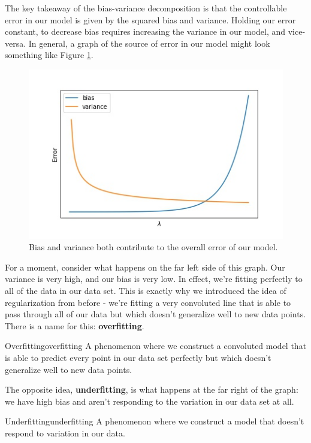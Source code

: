 \newpage
The key takeaway of the bias-variance decomposition is that the controllable error in our model is given by the squared bias and variance. Holding our error constant, to decrease bias requires increasing the variance in our model, and vice-versa. In general, a graph of the source of error in our model might look something like Figure \ref{fig:bias-vs-variance}.

\begin{figure}
    \centering
    \includegraphics[width=0.5\paperwidth]{../LinearRegression/fig/biasvariance_GEN.jpg}
    \caption{Bias and variance both contribute to the overall error of our model.}
    \label{fig:bias-vs-variance}
\end{figure}

For a moment, consider what happens on the far left side of this graph. Our variance is very high, and our bias is very low. In effect, we're fitting perfectly to all of the data in our data set. This is exactly why we introduced the idea of regularization from before - we're fitting a very convoluted line that is able to pass through all of our data but which doesn't generalize well to new data points. There is a name for this: \textbf{overfitting}.

\begin{definition}{Overfitting}{overfitting}
    A phenomenon where we construct a convoluted model that is able to predict every point in our data set perfectly but which doesn't generalize well to new data points.
\end{definition}

The opposite idea, \textbf{underfitting}, is what happens at the far right of the graph: we have high bias and aren't responding to the variation in our data set at all.

\begin{definition}{Underfitting}{underfitting}
    A phenomenon where we construct a model that doesn't respond to variation in our data.
\end{definition}

